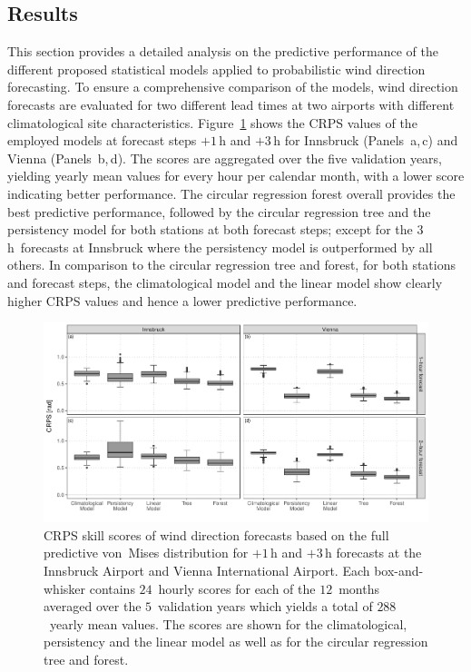 \documentclass{statsoc}
\begin{document}
\subsection{Results} 
This section provides a detailed analysis on the predictive performance of the
different proposed statistical models applied to probabilistic wind direction
forecasting. To ensure a comprehensive comparison of the models, wind direction
forecasts are evaluated for two different lead times at two airports with
different climatological site characteristics.
Figure~\ref{fig:boxplot_crpsraw} shows the CRPS values of the employed models
at forecast steps $+1$\,h and $+3$\,h for Innsbruck (Panels~a,\,c) and Vienna
(Panels~b,\,d). The scores are aggregated over the five validation years,
yielding yearly mean values for every hour per calendar month, with a lower
score indicating better performance. The circular regression forest overall
provides the best predictive performance, followed by the circular regression
tree and the persistency model for both stations at both forecast steps; except
for the $3$\,h~forecasts at Innsbruck where the persistency model is
outperformed by all others. In comparison to the circular regression tree and
forest, for both stations and forecast steps, the climatological model and the
linear model show clearly higher CRPS values and hence a lower predictive
performance.
\begin{figure}[t]
  \centering
  \includegraphics{_plot_circforest_validation_crpsraw_agg_comparison_with_lowff_v14b.pdf}
  \caption{CRPS skill scores of wind direction forecasts based on the full
    predictive von~Mises distribution for $+1$\,h and $+3$\,h forecasts at the
    Innsbruck Airport and Vienna International Airport. Each box-and-whisker contains $24$~hourly scores
    for each of the $12$~months averaged over the $5$~validation years which
    yields a total of $288$~yearly mean values. The scores are shown for the
    climatological, persistency and the linear model as well as for the circular
    regression tree and forest.}
  \label{fig:boxplot_crpsraw} 
\end{figure}
\end{document}
